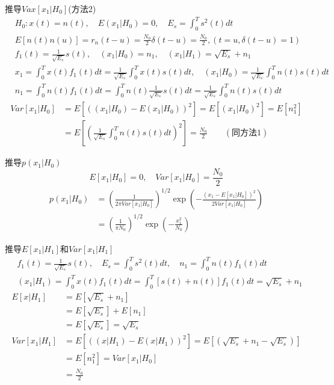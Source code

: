 \begin{frame}[shrink]{推导$Vax[x_1|H_0]$(方法2)}
\begin{align*}
&H_0: x(t)=n(t),\quad E(x_1|H_0)=0,\quad E_s=\int_{0}^{T}s^2(t)dt\\
&E[n(t)n(u)]=r_n(t-u)=\frac{N_0}{2}\delta(t-u)=\frac{N_0}{2},(t=u,\delta(t-u)=1)\\
&f_1(t)=\frac{1}{\sqrt{E_s}}s(t),\quad (x_1|H_0)=n_1,\quad (x_1|H_1)=\sqrt{E_s}+n_1\\ &x_1=\int_{0}^{T}x(t)f_1(t)dt=\frac{1}{\sqrt{E_s}}\int_{0}^{T}x(t)s(t)dt,\quad (x_1|H_0)=\frac{1}{\sqrt{E_s}}\int_{0}^{T}n(t)s(t)dt\\
&n_1=\int_{0}^{T}n(t)f_1(t)dt=\int_{0}^{T}n(t)\frac{1}{\sqrt{E_s}}s(t)dt=\frac{1}{\sqrt{E_s}}\int_{0}^{T}n(t)s(t)dt
\end{align*}
\begin{align*}
Var[x_1|H_0]&=E[((x_1|H_0)-E(x_1|H_0))^2]=E[(x_1|H_0)^2]=E[n_1^2]\\
&=E\left[\left(\frac{1}{\sqrt{E_s}}\int_{0}^{T}n(t)s(t)dt\right)^2\right]=\frac{N_0}{2}\qquad (\text{同方法1})
\end{align*}
\end{frame}

\begin{frame}{推导$p(x_1|H_0)$}
\[ E[x_1|H_0]=0,\quad Var[x_1|H_0]=\frac{N_0}{2}\]
\begin{align*}
p(x_1|H_0)&=\left(\frac{1}{2\pi Var[x_1|H_0]}\right)^{1/2}\exp\left(-\frac{(x_1-E[x_1|H_0])^2}{2Var[x_1|H_0]}\right)\\
&=\left(\frac{1}{\pi N_0}\right)^{1/2}\exp\left(-\frac{x_1^2}{N_0}\right)
\end{align*}
\end{frame}

\begin{frame}{推导$E[x_1|H_1]$和$Var[x_1|H_1]$}
\begin{align*}
&f_1(t)=\frac{1}{\sqrt{E_s}}s(t),\quad E_s=\int_{0}^{T}s^2(t)dt, \quad n_1=\int_{0}^{T}n(t)f_1(t)dt\\
&(x_1|H_1)=\int_{0}^{T}x(t)f_1(t)dt=\int_{0}^{T}[s(t)+n(t)]f_1(t)dt=\sqrt{E_s}+n_1
\end{align*}
\begin{align*}
E[x|H_1]&=E\left[\sqrt{E_s}+n_1\right]\\
&=E[\sqrt{E_s}]+E[n_1]\\
&=E[\sqrt{E_s}]=\sqrt{E_s}\\
Var[x_1|H_1]&=E[((x|H_1)-E(x|H_1))^2]=E[(\sqrt{E_s}+n_1-\sqrt{E_s})]\\
&=E[n_1^2]=Var[x_1|H_0]\\
&=\frac{N_0}{2}
\end{align*}
\end{frame}

